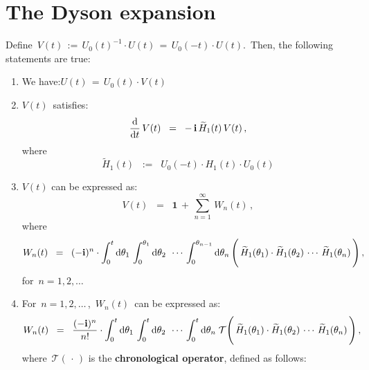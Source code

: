 
\vskip 0.5cm
\section{The Dyson expansion}


\begin{proposition}
\mbox{}\vskip 0.2cm
\noindent
Define \,$V(t) \, := \, U_{0}(t)^{-1} \cdot U(t) \, = \, U_{0}(-t) \cdot U(t)$.\,
Then, the following statements are true:
\begin{enumerate}
\item
	We have:\quad $U(t) \,= \, U_{0}(t) \cdot V(t)$
\item
	$V(t)$\, satisfies:
	\begin{equation*}
	\dfrac{\textnormal{d}}{\textnormal{d} t}\,V(t) \;\; = \;\; -\,\mathbf{i}\,\widetilde{H}_{1}(t)\,V(t)\,,
	\end{equation*}	
	where
	\begin{equation*}
	\widetilde{H}_{1}(t) \;\; := \;\; U_{0}(-t) \cdot H_{1}(t) \cdot U_{0}(t)
	\end{equation*}	
\item
	$V(t)$ can be expressed as:
	\begin{equation*}
	V(t) \;\; = \;\; \mathbf{1} \, + \, \overset{\infty}{\underset{n = 1}{\sum}}\,W_{n}(t)\,,
	\end{equation*}
	where
	\begin{equation*}
	W_{n}(t) \;\; = \;\; (-\i)^{n}\cdot
		\int_{0}^{t}\d\theta_{1} \, \int_{0}^{\theta_{1}}\d\theta_{2} \;\, \cdots \,  \int_{0}^{\theta_{n-1}}\d\theta_{n}
			\left(\,
				\overset{{\color{white}1}}{\widetilde{H}_{1}(\theta_{1})}
				\cdot
				\widetilde{H}_{1}(\theta_{2})
				\,\cdots\,
				\widetilde{H}_{1}(\theta_{n})
				\,\right),
	\;\;
	\end{equation*}
	for \,$n = 1, 2, \ldots$
\item
	For \,$n = 1, 2, \ldots$\,, \,$W_{n}(t)$\, can be expressed as:
	\begin{equation*}
	W_{n}(t) \;\; = \;\; \dfrac{(-\i)^{n}}{n!}\cdot
		\int_{0}^{t}\d\theta_{1} \, \int_{0}^{t}\d\theta_{2} \;\, \cdots \,  \int_{0}^{t}\d\theta_{n}\;
			\mathcal{T}\!\left(\,
				\overset{{\color{white}1}}{\widetilde{H}_{1}(\theta_{1})}
				\cdot
				\widetilde{H}_{1}(\theta_{2})
				\,\cdots\,
				\widetilde{H}_{1}(\theta_{n})
				\,\right),
	\end{equation*}
	where \,$\mathcal{T}(\,\cdot\,)$ is the \textbf{chronological operator}, defined as follows:

\end{enumerate}
\end{proposition}
